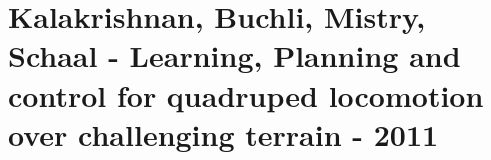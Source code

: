 \section{Kalakrishnan, Buchli, Mistry, Schaal - Learning, Planning and control for quadruped locomotion over challenging terrain - 2011}